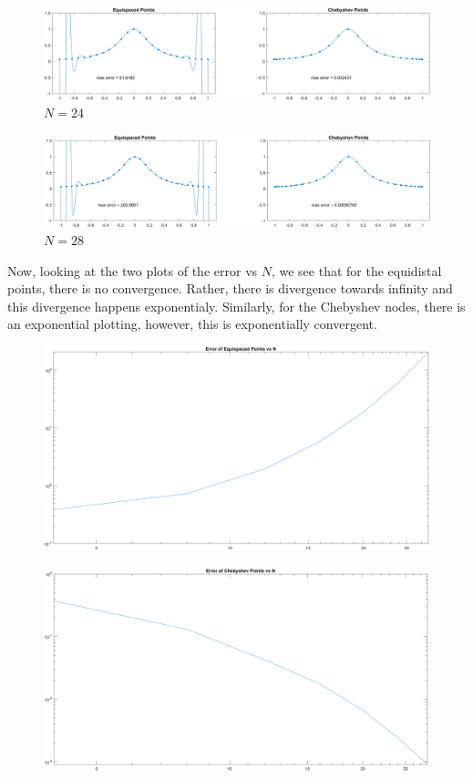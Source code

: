 \documentclass[12pt]{article}
\begin{document}
\begin{figure}[htp]
\centering
\includegraphics[scale=0.2]{5_124.PNG}
\caption{$N=24$}
\end{figure}
\begin{figure}[htp]
\centering
\includegraphics[scale=0.2]{5_128.PNG}
\caption{$N=28$}
\end{figure}

\newpage

Now, looking at the two plots of the error vs $N$, we see that for the equidistal points, there is no convergence.
Rather, there is divergence towards infinity and this divergence happens exponentialy. Similarly, for the Chebyshev
nodes, there is an exponential plotting, however, this is exponentially convergent.\\

\begin{figure}[htp]
\centering
\includegraphics[scale=0.12]{5_1equi.PNG}
\end{figure}
\begin{figure}[htp]
\centering
\includegraphics[scale=0.12]{5_1cheb.PNG}\\
\end{figure}
\end{document}
